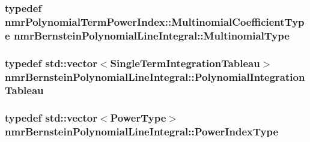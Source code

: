 \hypertarget{classnmr_bernstein_polynomial_line_integral_a284a932e77c5c38a5d6959c4992d5300}{
\subsubsection[{Multinomial\-Type}]{\setlength{\rightskip}{0pt plus 5cm}typedef {\bf nmr\-Polynomial\-Term\-Power\-Index\-::\-Multinomial\-Coefficient\-Type} {\bf nmr\-Bernstein\-Polynomial\-Line\-Integral\-::\-Multinomial\-Type}}}\label{classnmr_bernstein_polynomial_line_integral_a284a932e77c5c38a5d6959c4992d5300}
\hypertarget{classnmr_bernstein_polynomial_line_integral_a60deb00991c5e0971d60280bcbb7a405}{
\subsubsection[{Polynomial\-Integration\-Tableau}]{\setlength{\rightskip}{0pt plus 5cm}typedef std\-::vector$<${\bf Single\-Term\-Integration\-Tableau}$>$ {\bf nmr\-Bernstein\-Polynomial\-Line\-Integral\-::\-Polynomial\-Integration\-Tableau}\hspace{0.3cm}{\ttfamily [protected]}}}\label{classnmr_bernstein_polynomial_line_integral_a60deb00991c5e0971d60280bcbb7a405}
\hypertarget{classnmr_bernstein_polynomial_line_integral_a16dae5a5a7adabc4c3356c857aeb3841}{
\subsubsection[{Power\-Index\-Type}]{\setlength{\rightskip}{0pt plus 5cm}typedef std\-::vector$<${\bf Power\-Type}$>$ {\bf nmr\-Bernstein\-Polynomial\-Line\-Integral\-::\-Power\-Index\-Type}\hspace{0.3cm}{\ttfamily [protected]}}}\label{classnmr_bernstein_polynomial_line_integral_a16dae5a5a7adabc4c3356c857aeb3841}
